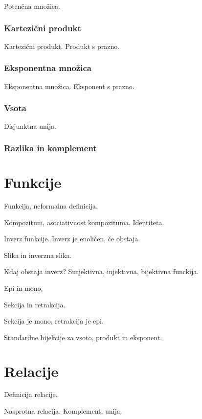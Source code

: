Potenčna množica.

\subsubsection{Kartezični produkt}
\label{sec:kartezicni-produkt}

Kartezični produkt. Produkt s prazno.

\subsubsection{Eksponentna množica}
\label{sec:eksponentna-mnozica}

Eksponentna množica. Eksponent s prazno.

\subsubsection{Vsota}
\label{sec:vsota-mnozic}

Disjunktna unija.

\subsubsection{Razlika in komplement}
\label{sec:vsota-mnozic}


\section{Funkcije}
\label{sec:funkcije}


Funkcija, neformalna definicija.

Kompozitum, asociativnost kompozituma. Identiteta.

Inverz funkcije. Inverz je enoličen, če obstaja.

Slika in inverzna slika.

Kdaj obstaja inverz? Surjektivna, injektivna, bijektivna funckija.

Epi in mono.

Sekcija in retrakcija.

Sekcija je mono, retrakcija je epi.

Standardne bijekcije za vsoto, produkt in eksponent.

\section{Relacije}
\label{sec:relacije}

Definicija relacije.

Nasprotna relacija. Komplement, unija.

